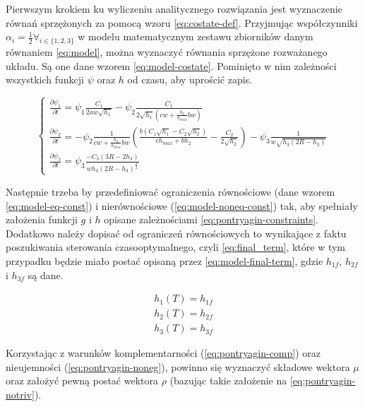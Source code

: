 Pierwszym krokiem ku wyliczeniu analitycznego rozwiązania jest wyznaczenie równań sprzężonych za pomocą wzoru \ref{eq:costate-def}. Przyjmując współczynniki $\alpha_{i} = \frac{1}{2} \forall_{i \in \{1, 2, 3\}}$ w modelu matematycznym zestawu zbiorników danym równaniem \ref{eq:model}, można wyznaczyć równania sprzężone rozważanego układu. Są one dane wzorem \ref{eq:model-costate}. Pominięto w nim zależności wszystkich funkcji $\psi$ oraz $h$ od czasu, aby uprościć zapis.

\begin{equation}\label{eq:model-costate}
	\left \{
	\begin{array}{lr}
		\frac{\partial \psi_{1}}{\partial t} =  \psi_{1}\frac{C_{1}}{2aw\sqrt{h_{1}}} - \psi_{2}\frac{C_{1}}{2\sqrt{h_{1}}(cw + \frac{h_{2}}{h_{max}}bw)} \\[20pt]
		\frac{\partial \psi_{2}}{\partial t} = - \psi_{2}\frac{1}{cw + \frac{h_{2}}{h_{max}}bw}(\frac{b(C_{1}\sqrt{h_{1}} - C_{2}\sqrt{h_{2}})}{ch_{max} + bh_{2}} - \frac{C_{2}}{2\sqrt{h_{2}}}) - \psi_{3}\frac{1}{w\sqrt{h_{3}(2R - h_{3})}} \\[20pt]
		\frac{\partial \psi_{3}}{\partial t} = \psi_{3}\frac{-C_{3}(3R - 2h_{3})}{wh_{3}(2R - h_{3})^{\frac{3}{2}}}
	\end{array}
	\right.
\end{equation}

Następnie trzeba by przedefiniować ograniczenia równościowe (dane wzorem \ref{eq:model-eq-const}) i nierównościowe (\ref{eq:model-noneq-const}) tak, aby spełniały założenia funkcji $g$ i $h$ opisane zależnościami \ref{eq:pontryagin-constraints}.
Dodatkowo należy dopisać od ograniczeń równościowych to wynikające z faktu poszukiwania sterowania czasooptymalnego, czyli \ref{eq:final_term}, które w tym przypadku będzie miało postać opisaną przez \ref{eq:model-final-term}, gdzie $h_{1f}$, $h_{2f}$ i $h_{3f}$ są dane.

\begin{equation}\label{eq:model-final-term}
\begin{array}{lr}
    h_{1}(T) = h_{1f}\\
    h_{2}(T) = h_{2f}\\
    h_{3}(T) = h_{3f}
\end{array}
\end{equation}

Korzystając z warunków komplementarności (\ref{eq:pontryagin-comp}) oraz nieujemności (\ref{eq:pontryagin-noneg}), powinno się wyznaczyć składowe wektora $\mu$ oraz założyć pewną postać wektora $\rho$ (bazując takie założenie na \ref{eq:pontryagin-notriv}).

